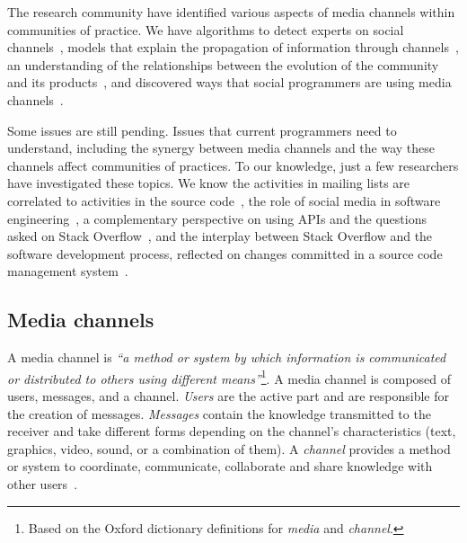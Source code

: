 
    The research community have identified various aspects of media channels within communities of practice.
    We have algorithms to detect experts on social channels~\cite{Pal2011a,Pal2012a}, models that explain the propagation of information through channels~\cite{Jin2013, Jiang2013}, an understanding of the relationships between the evolution of the community and its products~\cite{German2013}, and discovered ways that social programmers are using media channels~\cite{Sowe2008a, Singh2009, Parnin2013}.

    Some issues are still pending.
    Issues that current programmers need to understand, including the synergy between media channels and the way these channels affect communities of practices.
    To our knowledge, just a few researchers have investigated these topics.
    We know the activities in mailing lists are correlated to activities in the source code~\cite{Bird2006}, the role of social media in software engineering~\cite{Storey2014, Storey2010}, a complementary perspective on using APIs and the questions asked on Stack Overflow~\cite{Kavaler2013}, and the interplay between Stack Overflow and the software development process, reflected on changes committed in a source code management system~\cite{Vasilescu2013a}.

\subsection{Media channels}

    A media channel is \textit{``a method or system by which information is communicated or distributed to others using different means''}\footnote{Based on the Oxford dictionary definitions for \emph{media} and \emph{channel}.}.
    A media channel is composed of users, messages, and a channel.
    \textit{Users} are the active part and are responsible for the creation of messages.
    \textit{Messages} contain the knowledge transmitted to the receiver and take different forms depending on the channel's characteristics (text, graphics, video, sound, or a combination of them).
    A \textit{channel} provides a method or system to coordinate, communicate, collaborate and share knowledge with other users~\cite{Storey2014}.

